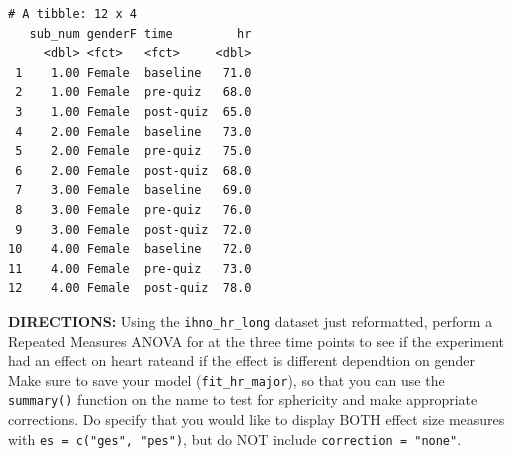 \documentclass[]{article}
\newenvironment{Shaded}{\begin{snugshade}}{\end{snugshade}}
\newcommand{\KeywordTok}[1]{\textcolor[rgb]{0.13,0.29,0.53}{\textbf{#1}}}
\newcommand{\DataTypeTok}[1]{\textcolor[rgb]{0.13,0.29,0.53}{#1}}
\newcommand{\DecValTok}[1]{\textcolor[rgb]{0.00,0.00,0.81}{#1}}
\newcommand{\StringTok}[1]{\textcolor[rgb]{0.31,0.60,0.02}{#1}}
\newcommand{\CommentTok}[1]{\textcolor[rgb]{0.56,0.35,0.01}{\textit{#1}}}
\newcommand{\OperatorTok}[1]{\textcolor[rgb]{0.81,0.36,0.00}{\textbf{#1}}}
\newcommand{\NormalTok}[1]{#1}
\begin{document}
\begin{Shaded}
\end{Shaded}

\begin{verbatim}
# A tibble: 12 x 4
   sub_num genderF time         hr
     <dbl> <fct>   <fct>     <dbl>
 1    1.00 Female  baseline   71.0
 2    1.00 Female  pre-quiz   68.0
 3    1.00 Female  post-quiz  65.0
 4    2.00 Female  baseline   73.0
 5    2.00 Female  pre-quiz   75.0
 6    2.00 Female  post-quiz  68.0
 7    3.00 Female  baseline   69.0
 8    3.00 Female  pre-quiz   76.0
 9    3.00 Female  post-quiz  72.0
10    4.00 Female  baseline   72.0
11    4.00 Female  pre-quiz   73.0
12    4.00 Female  post-quiz  78.0
\end{verbatim}

\clearpage

\textbf{DIRECTIONS:} Using the \texttt{ihno\_hr\_long} dataset just
reformatted, perform a Repeated Measures ANOVA for at the three time
points to see if the experiment had an effect on heart rateand if the
effect is different dependtion on gender Make sure to save your model
(\texttt{fit\_hr\_major}), so that you can use the \texttt{summary()}
function on the name to test for sphericity and make appropriate
corrections. Do specify that you would like to display BOTH effect size
measures with \texttt{es\ =\ c("ges",\ "pes")}, but do NOT include
\texttt{correction\ =\ "none"}.

\begin{Shaded}
\end{Shaded}
\end{document}
